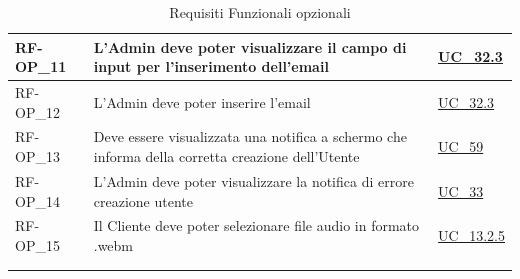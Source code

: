 \begin{longtable}{|>{\raggedright}p{}|>{\raggedright\arraybackslash}p{}|>{\raggedright\arraybackslash}p{}|}
	\hline
	RF-OP\_11 \hypertarget{rf-op_11} & L'Admin deve poter visualizzare il campo di input per l'inserimento dell'email & \hyperref[uc_32.3]{UC\_32.3} \\
	\hline
	RF-OP\_12 \hypertarget{rf-op_12} & L'Admin deve poter inserire l'email & \hyperref[uc_32.3]{UC\_32.3} \\
	\hline
	RF-OP\_13 \hypertarget{rf-op_13} & Deve essere visualizzata una notifica a schermo che informa della corretta creazione dell'Utente & \hyperref[uc_59]{UC\_59} \\
	\hline
	RF-OP\_14 \hypertarget{rf-op_14} & L'Admin deve poter visualizzare la notifica di errore creazione utente & \hyperref[uc_33]{UC\_33}\\
	\hline
	RF-OP\_15 \hypertarget{rf-op_15} & Il Cliente deve poter selezionare file audio in formato .webm & \hyperref[uc_13.2.5]{UC\_13.2.5} \\
	\hline
	\multicolumn{3}{c}{} \\
	\caption{Requisiti Funzionali opzionali}\hypertarget{tab:funzionali_opzionali}\\

\end{longtable}

